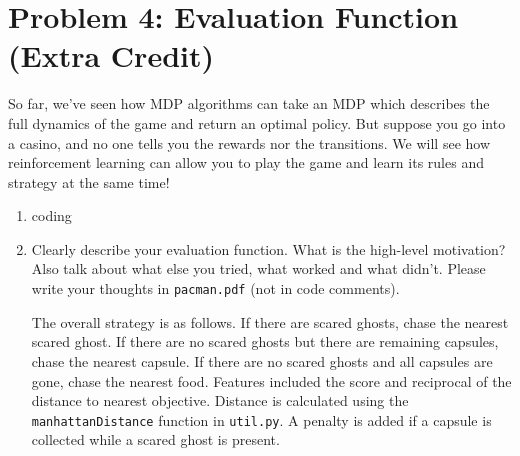 \documentclass[10pt]{article}
\begin{document}
\section*{\normalsize Problem 4: Evaluation Function (Extra Credit)}

So far, we've seen how MDP algorithms can take an MDP which describes the full dynamics of the game and return an optimal policy. But suppose you go into a casino, and no one tells you the rewards nor the transitions. We will see how reinforcement learning can allow you to play the game and learn its rules and strategy at the same time!

\begin{enumerate}[label=(\alph*)]

  \item coding
  
  \item Clearly describe your evaluation function. What is the high-level motivation? Also talk about what else you tried, what worked and what didn't. Please write your thoughts in \texttt{pacman.pdf} (not in code comments).
  
  The overall strategy is as follows. If there are scared ghosts, chase the nearest scared ghost. If there are no scared ghosts but there are remaining capsules, chase the nearest capsule. If there are no scared ghosts and all capsules are gone, chase the nearest food. Features included the score and reciprocal of the distance to nearest objective. Distance is calculated using the \texttt{manhattanDistance} function in \texttt{util.py}. A penalty is added if a capsule is collected while a scared ghost is present.
		
\end{enumerate}
\fi
\end{document}

